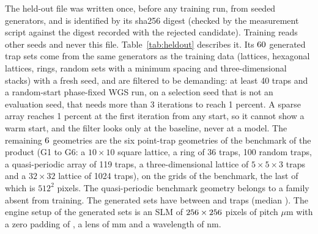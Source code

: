 The held-out file was written once, before any training run, from seeded generators, and is identified by its sha256 digest (checked by the measurement script against the digest recorded with the rejected candidate). Training reads other seeds and never this file. Table~\ref{tab:heldout} describes it. Its $60$ generated trap sets come from the same generators as the training data (lattices, hexagonal lattices, rings, random sets with a minimum spacing and three-dimensional
stacks) with a fresh seed, and are filtered to be demanding: at least 40 traps and a random-start phase-fixed WGS run, on a selection seed that is not an evaluation seed, that needs more than 3 iterations to reach 1 percent. A sparse array reaches 1 percent at the first iteration from any start, so it cannot show a warm start, and the filter looks only at the baseline, never at a model. The remaining $6$ geometries are the six point-trap geometries of
the benchmark of the product (G1 to G6: a $10\times10$ square lattice, a ring of 36 traps, 100 random traps, a quasi-periodic array of 119 traps, a three-dimensional lattice of $5\times5\times3$ traps and a $32\times32$ lattice of 1024 traps), on the grids of the benchmark, the last of which is $512^2$ pixels. The quasi-periodic benchmark geometry belongs to a family absent from training. The generated sets have between \trapsMin{} and \trapsMax{} traps (median \trapsMed). The engine setup of the generated sets is an SLM of $256\times256$ pixels of pitch \pitchUm{} $\mu$m with a zero padding of \padGen, a lens of \focalMm{} mm and a wavelength of \lambdaNm{} nm.

\begin{table}[t]
\centering\small
{}
\caption{Composition of the held-out set of $\nGeo$ trap geometries: the generated geometries are filtered to be demanding for the baseline, and the benchmark geometries are those of the product's benchmark; neither group is used in training.}
\label{tab:heldout}
\end{table}

